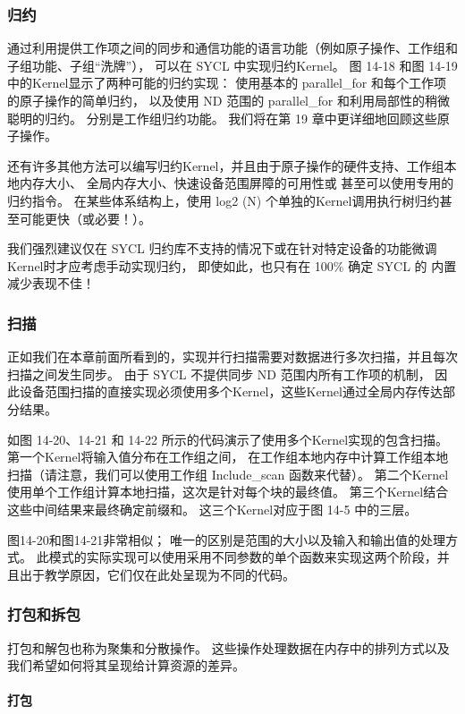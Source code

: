\subsubsection{归约}
通过利用提供工作项之间的同步和通信功能的语言功能（例如原子操作、工作组和子组功能、子组“洗牌”），
可以在 SYCL 中实现归约Kernel。 
图 14-18 和图 14-19 中的Kernel显示了两种可能的归约实现：
使用基本的 parallel\_for 和每个工作项的原子操作的简单归约，
以及使用 ND 范围的 parallel\_for 和利用局部性的稍微聪明的归约。 
分别是工作组归约功能。 我们将在第 19 章中更详细地回顾这些原子操作。

还有许多其他方法可以编写归约Kernel，并且由于原子操作的硬件支持、工作组本地内存大小、
全局内存大小、快速设备范围屏障的可用性或 甚至可以使用专用的归约指令。 
在某些体系结构上，使用 log2 (N) 个单独的Kernel调用执行树归约甚至可能更快（或必要！）。

我们强烈建议仅在 SYCL 归约库不支持的情况下或在针对特定设备的功能微调Kernel时才应考虑手动实现归约，
即使如此，也只有在 100\% 确定 SYCL 的 内置减少表现不佳！

\subsubsection{扫描}
正如我们在本章前面所看到的，实现并行扫描需要对数据进行多次扫描，并且每次扫描之间发生同步。 
由于 SYCL 不提供同步 ND 范围内所有工作项的机制，
因此设备范围扫描的直接实现必须使用多个Kernel，这些Kernel通过全局内存传达部分结果。

如图 14-20、14-21 和 14-22 所示的代码演示了使用多个Kernel实现的包含扫描。 
第一个Kernel将输入值分布在工作组之间，
在工作组本地内存中计算工作组本地扫描（请注意，我们可以使用工作组 Include\_scan 函数来代替）。 
第二个Kernel使用单个工作组计算本地扫描，这次是针对每个块的最终值。 
第三个Kernel结合这些中间结果来最终确定前缀和。 这三个Kernel对应于图 14-5 中的三层。

图14-20和图14-21非常相似； 唯一的区别是范围的大小以及输入和输出值的处理方式。 
此模式的实际实现可以使用采用不同参数的单个函数来实现这两个阶段，并且出于教学原因，它们仅在此处呈现为不同的代码。

\subsubsection{打包和拆包}
打包和解包也称为聚集和分散操作。 这些操作处理数据在内存中的排列方式以及我们希望如何将其呈现给计算资源的差异。

\paragraph{打包}

